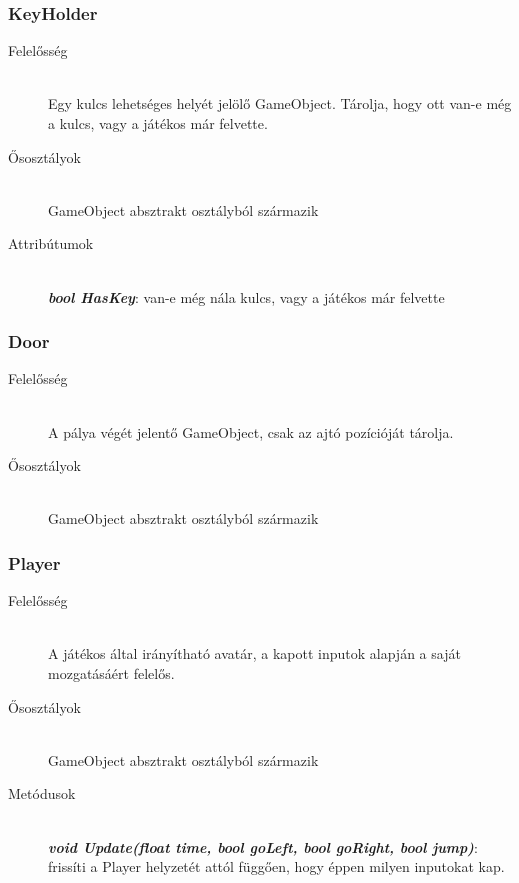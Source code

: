 \subsubsection{KeyHolder}
	\begin{description}
		\item[Felelősség] \hfill \\
		Egy kulcs lehetséges helyét jelölő GameObject. Tárolja, hogy ott van-e még a kulcs, vagy a játékos már felvette.
		
		\item[Ősosztályok]\hfill \\
		GameObject absztrakt osztályból származik
		
		\item[Attribútumok]\hfill \\
		\textbf{\emph{bool HasKey}}: van-e még nála kulcs, vagy a játékos már felvette
						
	\end{description}
	
\subsubsection{Door}
	\begin{description}
		\item[Felelősség] \hfill \\
		A pálya végét jelentő GameObject, csak az ajtó pozícióját tárolja.
		
		\item[Ősosztályok]\hfill \\
		GameObject absztrakt osztályból származik
						
	\end{description}
	
\subsubsection{Player}
	\begin{description}
		\item[Felelősség] \hfill \\
		A játékos által irányítható avatár, a kapott inputok alapján a saját mozgatásáért felelős.
		
		\item[Ősosztályok]\hfill \\
		GameObject absztrakt osztályból származik
		
		\item[Metódusok]\hfill \\
		\textbf{\emph{void Update(float time, bool goLeft, bool goRight, bool jump)}}: frissíti a Player helyzetét attól függően, hogy éppen milyen inputokat kap.
						
	\end{description}
	
